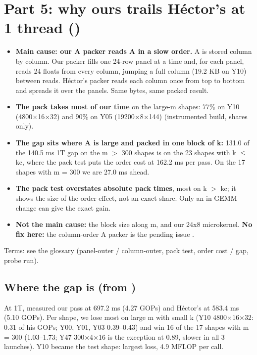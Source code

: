 \section{Part 5: why ours trails H\'ector's at 1 thread ()}\label{sec:95}
\begin{itemize}\setlength\itemsep{2pt}
\item \textbf{Main cause: our A packer reads A in a slow order.} A is stored column by column. Our packer fills one 24-row panel at a time and, for each panel, reads 24 floats from every column, jumping a full column (19.2 KB on Y10) between reads. H\'ector's packer reads each column once from top to bottom and spreads it over the panels. Same bytes, same packed result.
\item \textbf{The pack takes most of our time} on the large-m shapes: 77\% on Y10 (4800$\times$16$\times$32) and 90\% on Y05 (19200$\times$8$\times$144) (instrumented build, shares only).
\item \textbf{The gap sits where A is large and packed in one block of k:} 131.0 of the 140.5 ms 1T gap on the m $>$ 300 shapes is on the 23 shapes with k $\le$ kc, where the pack test puts the order cost at 162.2 ms per pass. On the 17 shapes with m = 300 we are 27.0 ms ahead.
\item \textbf{The pack test overstates absolute pack times}, most on k $>$ kc; it shows the size of the order effect, not an exact share. Only an in-GEMM change can give the exact gain.
\item \textbf{Not the main cause:} the block size along m, and our 24x8 microkernel. \textbf{No fix here:} the column-order A packer is the pending issue .
\end{itemize}
Terms: see the glossary (panel-outer / column-outer, pack test, order cost / gap, probe run).

\subsection{Where the gap is (from )}
At 1T,  measured our pass at 697.2 ms (4.27 GOPs) and H\'ector's at 583.4 ms (5.10 GOPs). Per shape, we lose most on large m with small k (Y10 4800$\times$16$\times$32: 0.31 of his GOPs; Y00, Y01, Y03 0.39--0.43) and win 16 of the 17 shapes with m = 300 (1.03--1.73; Y47 300$\times$4$\times$16 is the exception at 0.89, slower in all 3 launches). Y10 became the test shape: largest loss, 4.9 MFLOP per call.

